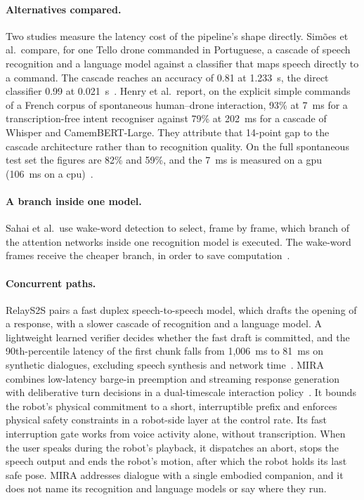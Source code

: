 \paragraph{Alternatives compared.} Two studies measure the latency cost of the pipeline's shape
directly. Sim\~oes et al.\ compare, for one Tello drone commanded in Portuguese, a cascade of speech
recognition and a language model against a classifier that maps speech directly to a command. The
cascade reaches an accuracy of 0.81 at 1.233~s, the direct classifier 0.99 at
0.021~s~\cite{simoes2024}. Henry et al.\ report, on the explicit simple commands of a French corpus
of spontaneous human--drone interaction, 93\% at 7~ms for a transcription-free intent recogniser
against 79\% at 202~ms for a cascade of Whisper and CamemBERT-Large. They attribute that 14-point
gap to the cascade architecture rather than to recognition quality. On the full spontaneous test set
the figures are 82\% and 59\%, and the 7~ms is measured on a \gls{gpu} (106~ms on a
\gls{cpu})~\cite{henry2026}.

\paragraph{A branch inside one model.} Sahai et al.\ use wake-word detection to select, frame by
frame, which branch of the attention networks inside one recognition model is executed. The
wake-word frames receive the cheaper branch, in order to save computation~\cite{dualattn2023}.

\paragraph{Concurrent paths.} RelayS2S pairs a fast duplex speech-to-speech model, which drafts the
opening of a response, with a slower cascade of recognition and a language model. A lightweight
learned verifier decides whether the fast draft is committed, and the 90th-percentile latency of the
first chunk falls from 1{,}006~ms to 81~ms on synthetic dialogues, excluding speech synthesis and
network time~\cite{relays2s}. MIRA combines low-latency barge-in preemption and streaming response
generation with deliberative turn decisions in a dual-timescale interaction policy~\cite{mira}. It
bounds the robot's physical commitment to a short, interruptible prefix and enforces physical safety
constraints in a robot-side layer at the control rate. Its fast interruption gate works from voice
activity alone, without transcription. When the user speaks during the robot's playback, it
dispatches an abort, stops the speech output and ends the robot's motion, after which the robot
holds its last safe pose. MIRA addresses dialogue with a single embodied companion, and it does not
name its recognition and language models or say where they run.

